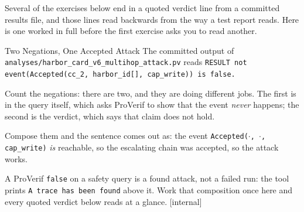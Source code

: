 \documentclass[11pt,a4paper]{article}
\theoremstyle{definition}
\begin{document}
Several of the exercises below end in a quoted verdict line from a committed results file, and those lines read backwards from the way a test report reads. Here is one worked in full before the first exercise asks you to read another.

\begin{pdexample}{Two Negations, One Accepted Attack}
\setlength{\parskip}{4pt plus 1pt}
The committed output of \texttt{analyses/harbor\_card\_v6\_}\allowbreak\texttt{multihop\_attack.pv}
reads \texttt{RESULT not event(Accepted(cc\_2, harbor\_id[], cap\_write)) is
false.}

Count the negations: there are two, and they are doing different jobs.
The first is in the query itself, which asks ProVerif to show that the
event \emph{never} happens; the second is the verdict, which says that
claim does not hold.

Compose them and the sentence comes out as: the event
\texttt{Accepted($\cdot$, $\cdot$, cap\_write)} \emph{is} reachable, so the
escalating chain was accepted, so the attack works.

A ProVerif
\texttt{false} on a safety query is a found attack, not a failed run: the
tool prints \texttt{A trace has been found} above it.
Work that composition once here and every quoted verdict below reads at a
glance. [internal]
\end{pdexample}

\end{document}
